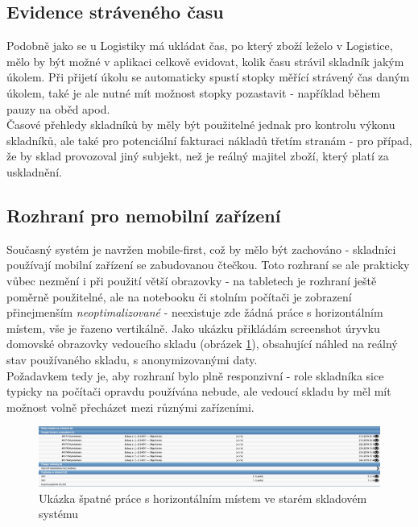 \subsection{Evidence stráveného času}

Podobně jako se u Logistiky má ukládat čas, po který zboží leželo v Logistice, mělo by být možné v aplikaci celkově evidovat, kolik času strávil skladník jakým úkolem. Při přijetí úkolu se automaticky spustí stopky měřící strávený čas daným úkolem, také je ale nutné mít možnost stopky pozastavit - například během pauzy na oběd apod.\\
Časové přehledy skladníků by měly být použitelné jednak pro kontrolu výkonu skladníků, ale také pro potenciální fakturaci nákladů třetím stranám - pro případ, že by sklad provozoval jiný subjekt, než je reálný majitel zboží, který platí za uskladnění.

\subsection{Rozhraní pro nemobilní zařízení}

Současný systém je navržen mobile-first, což by mělo být zachováno - skladníci používají mobilní zařízení se zabudovanou čtečkou. Toto rozhraní se ale prakticky vůbec nezmění i při použití větší obrazovky - na tabletech je rozhraní ještě poměrně použitelné, ale na notebooku či stolním počítači je zobrazení přinejmenším \emph{neoptimalizované} - neexistuje zde žádná práce s horizontálním místem, vše je řazeno vertikálně. Jako ukázku přikládám screenshot úryvku domovské obrazovky vedoucího skladu (obrázek \ref{picture:sysel:vertical}), obsahující náhled na reálný stav používaného skladu, s anonymizovanými daty.\\
Požadavkem tedy je, aby rozhraní bylo plně responzivní - role skladníka sice typicky na počítači opravdu používána nebude, ale vedoucí skladu by měl mít možnost volně přecházet mezi různými zařízeními.

\begin{figure}[]
\includegraphics[width=\textwidth]{../png/sysel/vertical.png}
\caption{Ukázka špatné práce s horizontálním místem ve starém skladovém systému} \label{picture:sysel:vertical}
\end{figure}

